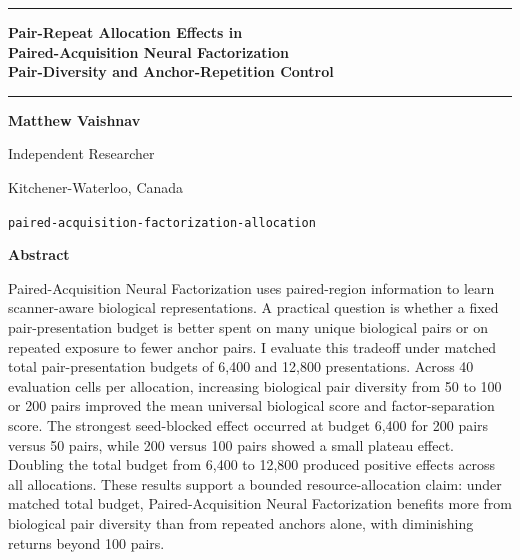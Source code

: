 ﻿\documentclass[10pt]{article}
\begin{document}
\begin{center}
\rule{\textwidth}{4pt}
\vspace{0.22in}

{\LARGE\bfseries Pair-Repeat Allocation Effects in\\
Paired-Acquisition Neural Factorization\\
Pair-Diversity and Anchor-Repetition Control\par}

\vspace{0.18in}
\rule{\textwidth}{0.4pt}
\vspace{0.32in}

{\bfseries Matthew Vaishnav}\par
Independent Researcher\par
Kitchener-Waterloo, Canada\par
\texttt{paired-acquisition-factorization-allocation}
\end{center}

\vspace{0.28in}

\begin{center}
{\bfseries Abstract}
\end{center}
\begin{center}
\begin{minipage}{0.82\textwidth}
\small
\setlength{\parindent}{0pt}
\setlength{\parskip}{0.25em}
\noindent Paired-Acquisition Neural Factorization uses paired-region information to learn scanner-aware biological representations. A practical question is whether a fixed pair-presentation budget is better spent on many unique biological pairs or on repeated exposure to fewer anchor pairs. I evaluate this tradeoff under matched total pair-presentation budgets of 6,400 and 12,800 presentations. Across 40 evaluation cells per allocation, increasing biological pair diversity from 50 to 100 or 200 pairs improved the mean universal biological score and factor-separation score. The strongest seed-blocked effect occurred at budget 6,400 for 200 pairs versus 50 pairs, while 200 versus 100 pairs showed a small plateau effect. Doubling the total budget from 6,400 to 12,800 produced positive effects across all allocations. These results support a bounded resource-allocation claim: under matched total budget, Paired-Acquisition Neural Factorization benefits more from biological pair diversity than from repeated anchors alone, with diminishing returns beyond 100 pairs.
\end{minipage}
\end{center}
\end{document}
